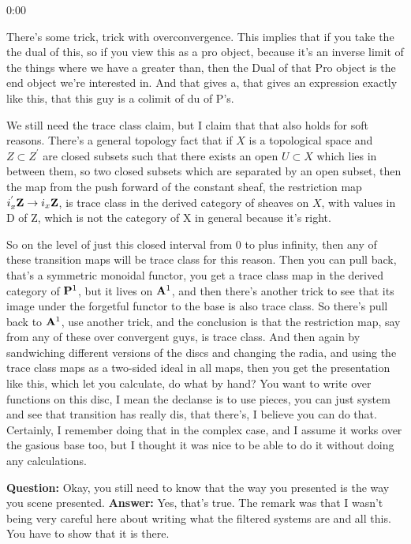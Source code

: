 \begin{unfinished}{0:00}
{There's some trick, trick with overconvergence. This implies that if you take the the dual of this, so if you view this as a pro object, because it's an inverse limit of the things where we have a greater than, then the Dual of that Pro object is the end object we're interested in. And that gives a, that gives an expression exactly like this, that this guy is a colimit of du of P's. 

We still need the trace class claim, but I claim that that also holds for soft reasons.
There's a general topology fact that if $X$ is a topological space and $Z \subset Z^{'}$ are closed subsets such that there exists an open $U \subset X$ which lies in between them, so two closed subsets which are separated by an open subset, then the map from the push forward of the constant sheaf, the restriction map $i_{x}^{'} \Z \to i_{x} \Z$, is trace class in the derived category of sheaves on $X$, with values in D of Z, which is not the category of X in general because it's right.

So on the level of just this closed interval from 0 to plus infinity, then any of these transition maps will be trace class for this reason. Then you can pull back, that's a symmetric monoidal functor, you get a trace class map in the derived category of $\P^1$, but it lives on $\A^1$, and then there's another trick to see that its image under the forgetful functor to the base is also trace class. So there's pull back to $\A^1$, use another trick, and the conclusion is that the restriction map, say from any of these over convergent guys, is trace class. 
And then again by sandwiching different versions of the discs and changing the radia, and using the trace class maps as a two-sided ideal in all maps, then you get the presentation like this, which let you calculate, do what by hand? You want to write over functions on this disc, I mean the declanse  is to use pieces, you can just system and see that transition has really dis, that there's, I believe you can do that. Certainly, I remember doing that in the complex case, and I assume it works over the gasious base too, but I thought it was nice to be able to do it without doing any calculations.

\textbf{Question:} Okay, you still need to know that the way you presented is the way you scene presented. 
\textbf{Answer:} Yes, that's true. The remark was that I wasn't being very careful here about writing what the filtered systems are and all this. You have to show that it is there.

}
\end{unfinished}
